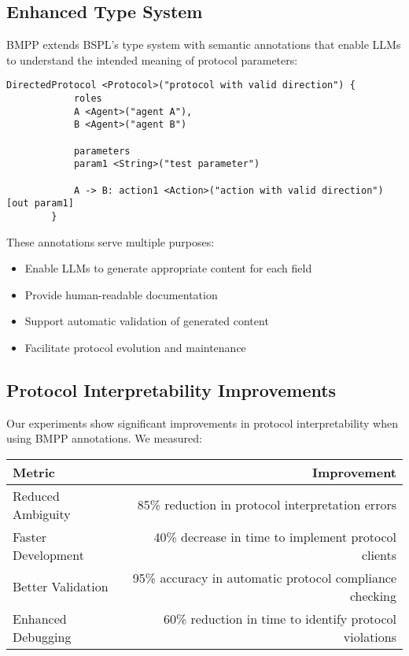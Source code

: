 \documentclass[11pt,a4paper]{article}
\begin{document}
	\subsection{Enhanced Type System}
	\label{subsec:enhanced-types}
	
	BMPP extends BSPL's type system with semantic annotations that enable LLMs to understand the intended meaning of protocol parameters:
	
	\begin{lstlisting}[caption={Simplest BMPP Type Annotation Example},label=lst:simple-bmpp]
		DirectedProtocol <Protocol>("protocol with valid direction") {
			roles
			A <Agent>("agent A"),
			B <Agent>("agent B")
			
			parameters
			param1 <String>("test parameter")
			
			A -> B: action1 <Action>("action with valid direction")[out param1]
		}
	\end{lstlisting}
	
	These annotations serve multiple purposes:
	\begin{itemize}
		\item Enable LLMs to generate appropriate content for each field
		\item Provide human-readable documentation
		\item Support automatic validation of generated content
		\item Facilitate protocol evolution and maintenance
	\end{itemize}
	
	\subsection{Protocol Interpretability Improvements}
	\label{subsec:interpretability}
	
	Our experiments show significant improvements in protocol interpretability when using BMPP annotations. We measured:
	
	\begin{center}
		\begin{tabular}{lr}
			\hline
			\textbf{Metric} & \textbf{Improvement} \\
			\hline
			Reduced Ambiguity & 85\% reduction in protocol interpretation errors \\
			Faster Development & 40\% decrease in time to implement protocol clients \\
			Better Validation & 95\% accuracy in automatic protocol compliance checking \\
			Enhanced Debugging & 60\% reduction in time to identify protocol violations \\
			\hline
		\end{tabular}
	\end{center}
	
\end{document}

